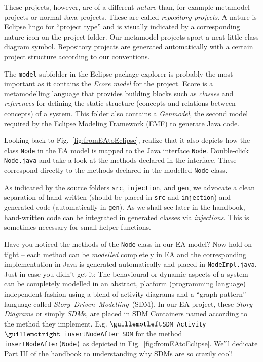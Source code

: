 These projects, however, are of a different \emph{nature} than, for example metamodel projects or normal Java projects. These are called \emph{repository
projects}. A nature is Eclipse lingo for ``project type'' and is visually indicated by a corresponding nature icon on the project folder. Our metamodel projects
sport a neat little class diagram symbol. Repository projects are generated automatically with a certain project structure according to our conventions.

The \texttt{model} subfolder in the Eclipse package explorer is probably the most important as it contains the \emph{Ecore model} for the project. Ecore is a
metamodelling language that provides building blocks such as \emph{classes} and \emph{references} for defining the  static structure (concepts and relations
between concepts) of a system. This folder also contains a \emph{Genmodel}, the second model required by the Eclipse Modeling Framework (EMF) to generate Java
code.

Looking back to Fig.~\ref{fig:fromEAtoEclipse}, realize that it also depicts how the class \texttt{Node} in the EA model is mapped to the Java interface
\texttt{Node}. Double-click \texttt{Node.java} and take a look at the methods declared in the interface. These correspond directly to the methods declared in
the modelled \texttt{Node} class.

As indicated by the source folders \texttt{src}, \texttt{injection}, and \texttt{gen}, we advocate a clean separation of hand-written (should be placed in
\texttt{src} and \texttt{injection}) and generated code (automatically in \texttt{gen}). As we shall see later in the handbook, hand-written code can be
integrated in generated classes via \emph{injections}. This is sometimes necessary for small helper functions.

Have you noticed the methods of the \texttt{Node} class in our EA model?  Now hold on tight -- each method can be \emph{modelled} completely in EA and the
corresponding implementation in Java is generated automatically and placed in \texttt{NodeImpl.java}. Just in case you didn't get it: The behavioural or dynamic
aspects of a system can be completely modelled in an abstract, platform (programming language) independent fashion using a blend of activity  diagrams and a ``graph pattern'' language called \textit{Story~Driven~Modelling}~(SDM). In our EA project, these
\emph{Story Diagrams} or simply \emph{SDM}s, are placed in SDM Containers named according to the method they implement. E.g.  \texttt{$\guillemotleft$SDM
Activity$\guillemotright$ insertNodeAfter SDM} for the method \texttt{insertNodeAft\-er(Node)} as depicted in Fig.~\ref{fig:fromEAtoEclipse}.  We'll dedicate
Part III of the handbook to understanding why SDMs are so  {\huge crazily} cool!

